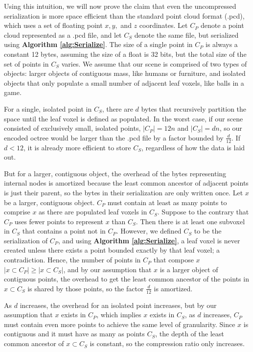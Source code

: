 \documentclass[twoside,twocolumn]{article}
\begin{document}
Using this intuition, we will now prove the claim that even the uncompressed serialization is more
space efficient than the standard point cloud format (.pcd), which uses a set of floating point
$x, y,$ and $z$ coordinates. Let $C_P$ denote a point cloud represented as a .pcd file, and let $C_S$
denote the same file, but serialized using \textbf{Algorithm \ref{alg:Serialize}}. The size of a single point in $C_P$
is always a constant 12 bytes, assuming the size of a float is 32 bits, but the total size of the set
of points in $C_S$ varies. We assume that our scene is comprised of two types of objects: larger objects
of contiguous mass, like humans or furniture, and isolated objects that only populate a small number
of adjacent leaf voxels, like balls in a game.

For a single, isolated point in $C_S$, there are $d$ bytes that recursively partition the space until the
leaf voxel is defined as populated. In the worst case, if our scene consisted of exclusively small, isolated
points, $|C_P| = 12n$ and $|C_S| = dn$, so our encoded octree would be larger than the .pcd file by a factor
bounded by $\frac{d}{12}$. If $d < 12$, it is already more efficient to store $C_S$, regardless of how the
data is laid out.


But for a larger, contiguous object, the overhead of the bytes representing internal nodes is
amortized because the least common ancestor of adjacent points is just their parent, so the bytes
in their serialization are only written once. Let $x$ be a larger, contiguous object. $C_P$ must
contain at least as many points to comprise $x$ as there are populated leaf voxels in $C_S$. Suppose
to the contrary that $C_P$ uses fewer points to represent $x$ than $C_S$. Then there is at least one
subvoxel in $C_S$ that contains a point not in $C_P$. However, we defined $C_S$ to be the serialization
of $C_P$, and using \textbf{Algorithm \ref{alg:Serialize}}, a leaf voxel is never created unless there
exists a point bounded exactly by that leaf voxel; a contradiction. Hence, the number of points in $C_P$
that compose $x$ $|x \subset C_P| \geq |x \subset C_S|$, and by our assumption that $x$ is a larger
object of contiguous points, the overhead to get the least common ancestor of the points in
$x \subset C_S$ is shared by those points, so the factor $\frac{d}{12}$ is amortized.

As $d$ increases, the overhead for an isolated point increases, but by our assumption that $x$ exists
in $C_P$, which implies $x$ exists in $C_S$, as $d$ increases, $C_P$ must contain even more points
to achieve the same level of granularity. Since $x$ is contiguous and it must have as many as points
$C_S$, the depth of the least common ancestor of $x \subset C_S$ is constant, so the compression ratio
only increases.
\end{document}
